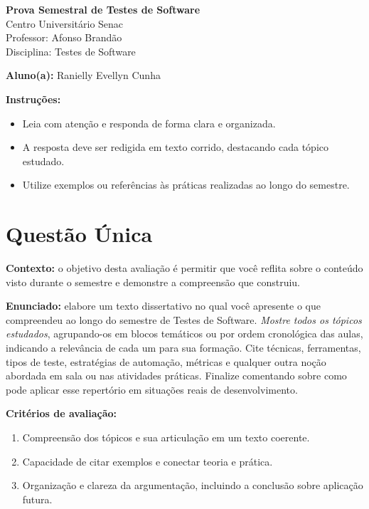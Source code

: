 \documentclass[12pt]{article}
\begin{document}
\newpage


\begin{center}
  {\Large \textbf{Prova Semestral de Testes de Software}}\\
  Centro Universitário Senac\\
  Professor: Afonso Brandão\\
  Disciplina: Testes de Software
\end{center}

\vspace{0.4cm}

\begin{center}
  \textbf{Aluno(a):} Ranielly Evellyn Cunha
\end{center}

\vspace{0.5cm}

\begin{center}
  \textbf{Instruções:}
\end{center}
\begin{itemize}[leftmargin=*]
  \item Leia com atenção e responda de forma clara e organizada.
  \item A resposta deve ser redigida em texto corrido, destacando cada tópico estudado.
  \item Utilize exemplos ou referências às práticas realizadas ao longo do semestre.
\end{itemize}

\section*{Questão Única}
\textbf{Contexto:} o objetivo desta avaliação é permitir que você reflita sobre o conteúdo visto durante o semestre e demonstre a compreensão que construiu.

\textbf{Enunciado:} elabore um texto dissertativo no qual você apresente o que compreendeu ao longo do semestre de Testes de Software. \textit{Mostre todos os tópicos estudados}, agrupando-os em blocos temáticos ou por ordem cronológica das aulas, indicando a relevância de cada um para sua formação. Cite técnicas, ferramentas, tipos de teste, estratégias de automação, métricas e qualquer outra noção abordada em sala ou nas atividades práticas. Finalize comentando sobre como pode aplicar esse repertório em situações reais de desenvolvimento.

\textbf{Critérios de avaliação:}
\begin{enumerate}[label=\arabic*.]
  \item Compreensão dos tópicos e sua articulação em um texto coerente.
  \item Capacidade de citar exemplos e conectar teoria e prática.
  \item Organização e clareza da argumentação, incluindo a conclusão sobre aplicação futura.
\end{enumerate}
\end{document}
